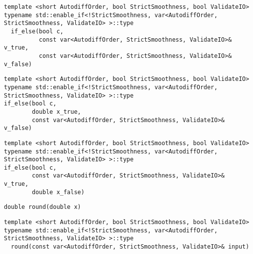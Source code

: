 \begin{tcolorbox}[colback=white,colframe=gray90, coltitle=black,boxrule=3pt,
fonttitle=\bfseries,title= If Else]

\begin{verbatim}
template <short AutodiffOrder, bool StrictSmoothness, bool ValidateIO>
typename std::enable_if<!StrictSmoothness, var<AutodiffOrder, StrictSmoothness, ValidateIO> >::type
  if_else(bool c,
          const var<AutodiffOrder, StrictSmoothness, ValidateIO>& v_true,
          const var<AutodiffOrder, StrictSmoothness, ValidateIO>& v_false)

\end{verbatim}

\begin{verbatim}
template <short AutodiffOrder, bool StrictSmoothness, bool ValidateIO>
typename std::enable_if<!StrictSmoothness, var<AutodiffOrder, StrictSmoothness, ValidateIO> >::type
if_else(bool c,
        double x_true,
        const var<AutodiffOrder, StrictSmoothness, ValidateIO>& v_false)

\end{verbatim}

\begin{verbatim}
template <short AutodiffOrder, bool StrictSmoothness, bool ValidateIO>
typename std::enable_if<!StrictSmoothness, var<AutodiffOrder, StrictSmoothness, ValidateIO> >::type
if_else(bool c,
        const var<AutodiffOrder, StrictSmoothness, ValidateIO>& v_true,
        double x_false)

\end{verbatim}

\end{tcolorbox}

\begin{tcolorbox}[colback=white,colframe=gray90, coltitle=black,boxrule=3pt,
fonttitle=\bfseries,title= Round]

\begin{verbatim}
double round(double x)

\end{verbatim}

\begin{verbatim}
template <short AutodiffOrder, bool StrictSmoothness, bool ValidateIO>
typename std::enable_if<!StrictSmoothness, var<AutodiffOrder, StrictSmoothness, ValidateIO> >::type
  round(const var<AutodiffOrder, StrictSmoothness, ValidateIO>& input)

\end{verbatim}

\end{tcolorbox}

